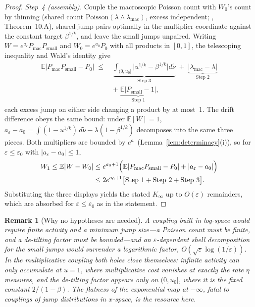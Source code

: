 \documentclass[pdflatex,sn-mathphys-num]{sn-jnl}
\theoremstyle{thmstyleone}
\theoremstyle{thmstyletwo}
\newtheorem*{remark}{Remark}
\theoremstyle{thmstylethree}
\begin{document}
\begin{proof}
\textit{Step~4 (assembly).}  Couple the macroscopic Poisson count
with $W_0$'s count by thinning (shared count
$\mathrm{Poisson}(\lambda\wedge\lambda_{\mathrm{mac}})$, excess
independent; \cite{BHJ92}, Theorem~10.A), shared jump pairs
optimally in the multiplier coordinate against the constant target
$\beta^{1/k}$, and leave the small jumps unpaired.  Writing $W =
e^{a_\varepsilon}P_{\mathrm{mac}}P_{\mathrm{small}}$ and $W_0 =
e^{a_0}P_0$ with all products in $[0,1]$, the telescoping inequality
and Wald's identity give
\[
\begin{aligned}
  \mathbb{E}\bigl|P_{\mathrm{mac}}P_{\mathrm{small}} - P_0\bigr|
  \;\le\;
  &\underbrace{\int_{(0,u_0]}\!\bigl|u^{1/k}-\beta^{1/k}\bigr|
  d\tilde\nu}_{\text{Step 3}}
  \;+\;
  \underbrace{\bigl|\lambda_{\mathrm{mac}} -
  \lambda\bigr|}_{\text{Step 2}}\\
  &+\;
  \underbrace{\mathbb{E}\bigl|P_{\mathrm{small}} -
  1\bigr|}_{\text{Step 1}},
\end{aligned}
\]
each excess jump on either side changing a product by at most~1.
The drift difference obeys the same bound: under $\mathbb{E}[W]=1$,
$a_\varepsilon - a_0 = \int(1-u^{1/k})\,d\tilde\nu -
\lambda(1-\beta^{1/k})$ decomposes into the same three pieces.  Both
multipliers are bounded by $e^{a_\cdot}$
(Lemma~\ref{lem:determinacy}(i)), so for $\varepsilon \le
\varepsilon_0$ with $|a_\varepsilon - a_0| \le 1$,
\[
\begin{aligned}
  W_1 \le \mathbb{E}|W - W_0|
  &\le e^{a_0+1}\Bigl(\mathbb{E}|P_{\mathrm{mac}}P_{\mathrm{small}}
  - P_0| + |a_\varepsilon - a_0|\Bigr)\\
  &\le 2e^{a_0+1}\bigl[\text{Step 1} + \text{Step 2} +
  \text{Step 3}\bigr].
\end{aligned}
\]
Substituting the three displays yields the stated $K_\infty$ up to
$O(\varepsilon)$ remainders, which are absorbed for $\varepsilon
\le \varepsilon_0$ as in the statement.
\end{proof}

\begin{remark}[Why no hypotheses are needed]
A coupling built in log-space would require finite activity and a
minimum jump size---a Poisson count must be finite, and a de-tilting
factor must be bounded---and an $\varepsilon$-dependent shell
decomposition for the small jumps would surrender a logarithmic
factor, $O(\sqrt\varepsilon\log(1/\varepsilon))$.  In the
multiplicative coupling both holes close themselves: infinite
activity can only accumulate at $u = 1$, where multiplicative cost
vanishes at exactly the rate $\eta$ measures, and the de-tilting
factor appears only on $(0,u_0]$, where it is the fixed constant
$2/(1-\beta)$.  The flatness of the exponential map at $-\infty$,
fatal to couplings of jump distributions in $x$-space, is the
resource here.
\end{remark}
\end{document}

